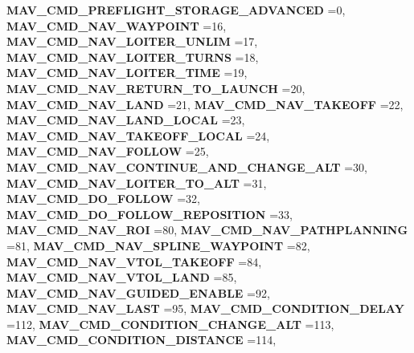 \begin{DoxyCompactItemize}
\textbf{ M\+A\+V\+\_\+\+C\+M\+D\+\_\+\+P\+R\+E\+F\+L\+I\+G\+H\+T\+\_\+\+S\+T\+O\+R\+A\+G\+E\+\_\+\+A\+D\+V\+A\+N\+C\+ED} =0, 
\textbf{ M\+A\+V\+\_\+\+C\+M\+D\+\_\+\+N\+A\+V\+\_\+\+W\+A\+Y\+P\+O\+I\+NT} =16, 
\newline
\textbf{ M\+A\+V\+\_\+\+C\+M\+D\+\_\+\+N\+A\+V\+\_\+\+L\+O\+I\+T\+E\+R\+\_\+\+U\+N\+L\+IM} =17, 
\textbf{ M\+A\+V\+\_\+\+C\+M\+D\+\_\+\+N\+A\+V\+\_\+\+L\+O\+I\+T\+E\+R\+\_\+\+T\+U\+R\+NS} =18, 
\textbf{ M\+A\+V\+\_\+\+C\+M\+D\+\_\+\+N\+A\+V\+\_\+\+L\+O\+I\+T\+E\+R\+\_\+\+T\+I\+ME} =19, 
\textbf{ M\+A\+V\+\_\+\+C\+M\+D\+\_\+\+N\+A\+V\+\_\+\+R\+E\+T\+U\+R\+N\+\_\+\+T\+O\+\_\+\+L\+A\+U\+N\+CH} =20, 
\newline
\textbf{ M\+A\+V\+\_\+\+C\+M\+D\+\_\+\+N\+A\+V\+\_\+\+L\+A\+ND} =21, 
\textbf{ M\+A\+V\+\_\+\+C\+M\+D\+\_\+\+N\+A\+V\+\_\+\+T\+A\+K\+E\+O\+FF} =22, 
\textbf{ M\+A\+V\+\_\+\+C\+M\+D\+\_\+\+N\+A\+V\+\_\+\+L\+A\+N\+D\+\_\+\+L\+O\+C\+AL} =23, 
\textbf{ M\+A\+V\+\_\+\+C\+M\+D\+\_\+\+N\+A\+V\+\_\+\+T\+A\+K\+E\+O\+F\+F\+\_\+\+L\+O\+C\+AL} =24, 
\newline
\textbf{ M\+A\+V\+\_\+\+C\+M\+D\+\_\+\+N\+A\+V\+\_\+\+F\+O\+L\+L\+OW} =25, 
\textbf{ M\+A\+V\+\_\+\+C\+M\+D\+\_\+\+N\+A\+V\+\_\+\+C\+O\+N\+T\+I\+N\+U\+E\+\_\+\+A\+N\+D\+\_\+\+C\+H\+A\+N\+G\+E\+\_\+\+A\+LT} =30, 
\textbf{ M\+A\+V\+\_\+\+C\+M\+D\+\_\+\+N\+A\+V\+\_\+\+L\+O\+I\+T\+E\+R\+\_\+\+T\+O\+\_\+\+A\+LT} =31, 
\textbf{ M\+A\+V\+\_\+\+C\+M\+D\+\_\+\+D\+O\+\_\+\+F\+O\+L\+L\+OW} =32, 
\newline
\textbf{ M\+A\+V\+\_\+\+C\+M\+D\+\_\+\+D\+O\+\_\+\+F\+O\+L\+L\+O\+W\+\_\+\+R\+E\+P\+O\+S\+I\+T\+I\+ON} =33, 
\textbf{ M\+A\+V\+\_\+\+C\+M\+D\+\_\+\+N\+A\+V\+\_\+\+R\+OI} =80, 
\textbf{ M\+A\+V\+\_\+\+C\+M\+D\+\_\+\+N\+A\+V\+\_\+\+P\+A\+T\+H\+P\+L\+A\+N\+N\+I\+NG} =81, 
\textbf{ M\+A\+V\+\_\+\+C\+M\+D\+\_\+\+N\+A\+V\+\_\+\+S\+P\+L\+I\+N\+E\+\_\+\+W\+A\+Y\+P\+O\+I\+NT} =82, 
\newline
\textbf{ M\+A\+V\+\_\+\+C\+M\+D\+\_\+\+N\+A\+V\+\_\+\+V\+T\+O\+L\+\_\+\+T\+A\+K\+E\+O\+FF} =84, 
\textbf{ M\+A\+V\+\_\+\+C\+M\+D\+\_\+\+N\+A\+V\+\_\+\+V\+T\+O\+L\+\_\+\+L\+A\+ND} =85, 
\textbf{ M\+A\+V\+\_\+\+C\+M\+D\+\_\+\+N\+A\+V\+\_\+\+G\+U\+I\+D\+E\+D\+\_\+\+E\+N\+A\+B\+LE} =92, 
\textbf{ M\+A\+V\+\_\+\+C\+M\+D\+\_\+\+N\+A\+V\+\_\+\+L\+A\+ST} =95, 
\newline
\textbf{ M\+A\+V\+\_\+\+C\+M\+D\+\_\+\+C\+O\+N\+D\+I\+T\+I\+O\+N\+\_\+\+D\+E\+L\+AY} =112, 
\textbf{ M\+A\+V\+\_\+\+C\+M\+D\+\_\+\+C\+O\+N\+D\+I\+T\+I\+O\+N\+\_\+\+C\+H\+A\+N\+G\+E\+\_\+\+A\+LT} =113, 
\textbf{ M\+A\+V\+\_\+\+C\+M\+D\+\_\+\+C\+O\+N\+D\+I\+T\+I\+O\+N\+\_\+\+D\+I\+S\+T\+A\+N\+CE} =114, 

\end{DoxyCompactItemize}
